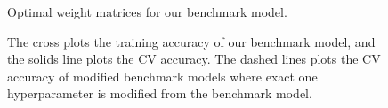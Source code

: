 \begin{figure}
    \caption{\label{fig:weight} Optimal weight matrices for our benchmark model.}
\end{figure}
\begin{figure}
    \caption{The cross plots the training accuracy of our benchmark model, and the  solids line plots the CV accuracy. The dashed lines plots the CV accuracy of modified benchmark models where exact one hyperparameter is modified from the benchmark model.}
    \label{fig:acc-iter}
\end{figure}
